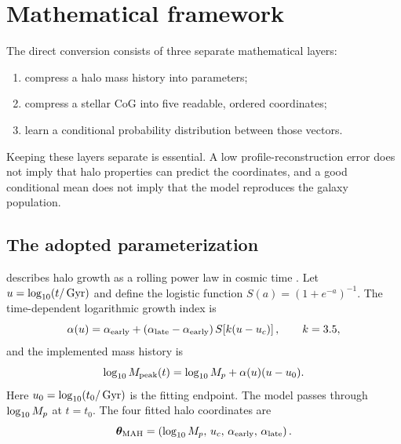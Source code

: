 \section{Mathematical framework}
\label{sec:math}

The direct conversion consists of three separate mathematical layers:
\begin{enumerate}
  \item compress a halo mass history into \diffmah{} parameters;
  \item compress a stellar CoG into five readable, ordered coordinates;
  \item learn a conditional probability distribution between those vectors.
\end{enumerate}
Keeping these layers separate is essential. A low profile-reconstruction error
does not imply that halo properties can predict the coordinates, and a good
conditional mean does not imply that the model reproduces the galaxy population.

\subsection{The adopted \diffmah{} parameterization}
\label{sec:diffmah}

\diffmah{} describes halo growth as a rolling power law in cosmic time
\citep{Hearin2021}. Let $u=\log_{10}(t/\,\mathrm{Gyr})$ and define the logistic function
$S(a)=(1+e^{-a})^{-1}$. The time-dependent logarithmic growth index is
\begin{equation}
  \alpha(u)=\alpha_{\rm early}+
  \left(\alpha_{\rm late}-\alpha_{\rm early}\right)
  S\!\left[k(u-u_c)\right],
  \qquad k=3.5,
  \label{eq:diffmah_alpha}
\end{equation}
and the implemented mass history is
\begin{equation}
  \log_{10} M_{\mathrm{peak}}(t)=\log_{10} M_p+\alpha(u)(u-u_0).
  \label{eq:diffmah_mass}
\end{equation}
Here $u_0=\log_{10}(t_0/\,\mathrm{Gyr})$ is the fitting endpoint. The model passes through
$\log_{10} M_p$ at $t=t_0$. The four fitted halo coordinates are
\begin{equation}
  \bm{\theta}_{\rm MAH}=
  \left(\log_{10} M_p,\,u_c,\,\alpha_{\rm early},\,\alpha_{\rm late}\right).
  \label{eq:mah_vector}
\end{equation}


